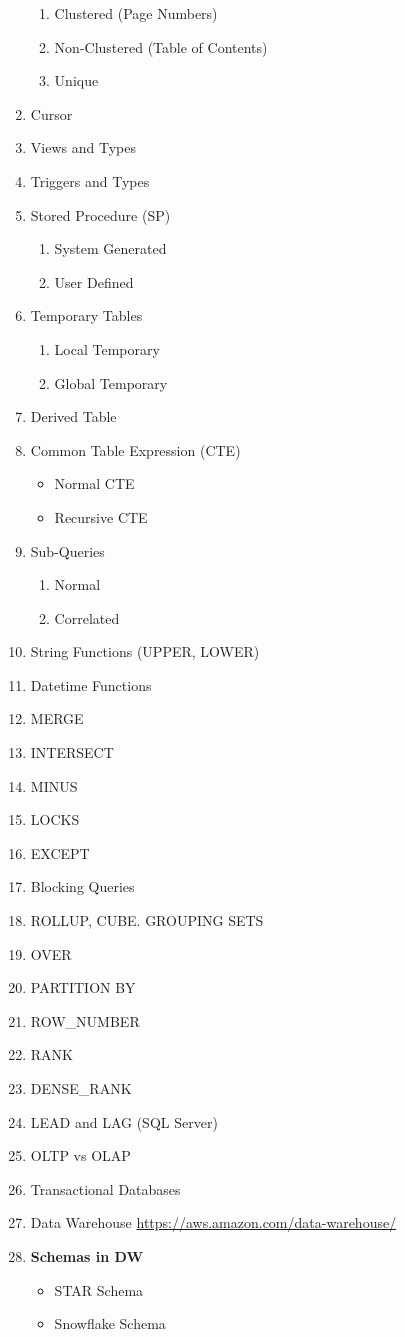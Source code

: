 \documentclass[11pt]{article}
\begin{document}
\begin{enumerate}
\begin{enumerate}
	\item Clustered (Page Numbers)
	\item Non-Clustered (Table of Contents)
	\item Unique
\end{enumerate}
\item Cursor
\item Views and Types 
\item Triggers and Types
\item Stored Procedure (SP)
\begin{enumerate}
	\item System Generated
	\item User Defined
\end{enumerate}
\item Temporary Tables
\begin{enumerate}
	\item Local Temporary
	\item Global Temporary
\end{enumerate}
\item Derived Table
\item Common Table Expression (CTE)
\begin{itemize}
	\item Normal CTE
	\item Recursive CTE
\end{itemize}
\item Sub-Queries
\begin{enumerate}
	\item Normal
	\item Correlated
\end{enumerate}
\item String Functions (UPPER, LOWER)
\item Datetime Functions
\item MERGE
 \item INTERSECT
\item MINUS
\item LOCKS
\item EXCEPT
\item Blocking Queries
\item ROLLUP, CUBE. GROUPING SETS
\item OVER
\item PARTITION BY
\item ROW\_NUMBER
\item RANK
\item DENSE\_RANK
\item LEAD and LAG (SQL Server)
\item OLTP vs OLAP
\item Transactional Databases
\item Data Warehouse \url{https://aws.amazon.com/data-warehouse/}
\item \textbf{Schemas in DW}
\begin{itemize}
	\item STAR Schema
	\item Snowflake Schema
\end{itemize}
\end{enumerate}
\end{document}
